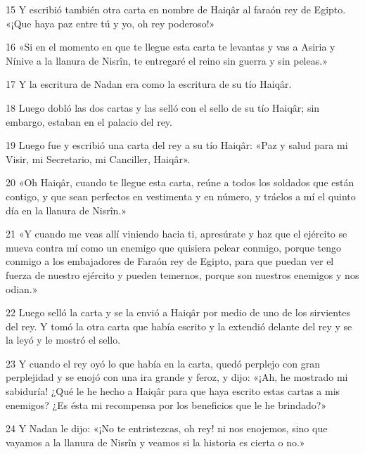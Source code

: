 \par 15 Y escribió también otra carta en nombre de Haiqâr al faraón rey de Egipto. «¡Que haya paz entre tú y yo, oh rey poderoso!»

\par 16 «Si en el momento en que te llegue esta carta te levantas y vas a Asiria y Nínive a la llanura de Nisrîn, te entregaré el reino sin guerra y sin peleas.»

\par 17 Y la escritura de Nadan era como la escritura de su tío Haiqâr.

\par 18 Luego dobló las dos cartas y las selló con el sello de su tío Haiqâr; sin embargo, estaban en el palacio del rey.

\par 19 Luego fue y escribió una carta del rey a su tío Haiqâr: «Paz y salud para mi Visir, mi Secretario, mi Canciller, Haiqâr».

\par 20 «Oh Haiqâr, cuando te llegue esta carta, reúne a todos los soldados que están contigo, y que sean perfectos en vestimenta y en número, y tráelos a mí el quinto día en la llanura de Nisrîn.»

\par 21 «Y cuando me veas allí viniendo hacia ti, apresúrate y haz que el ejército se mueva contra mí como un enemigo que quisiera pelear conmigo, porque tengo conmigo a los embajadores de Faraón rey de Egipto, para que puedan ver el fuerza de nuestro ejército y pueden temernos, porque son nuestros enemigos y nos odian.»

\par 22 Luego selló la carta y se la envió a Haiqâr por medio de uno de los sirvientes del rey. Y tomó la otra carta que había escrito y la extendió delante del rey y se la leyó y le mostró el sello.

\par 23 Y cuando el rey oyó lo que había en la carta, quedó perplejo con gran perplejidad y se enojó con una ira grande y feroz, y dijo: «¡Ah, he mostrado mi sabiduría! ¿Qué le he hecho a Haiqâr para que haya escrito estas cartas a mis enemigos? ¿Es ésta mi recompensa por los beneficios que le he brindado?»

\par 24 Y Nadan le dijo: «¡No te entristezcas, oh rey! ni nos enojemos, sino que vayamos a la llanura de Nisrîn y veamos si la historia es cierta o no.»

